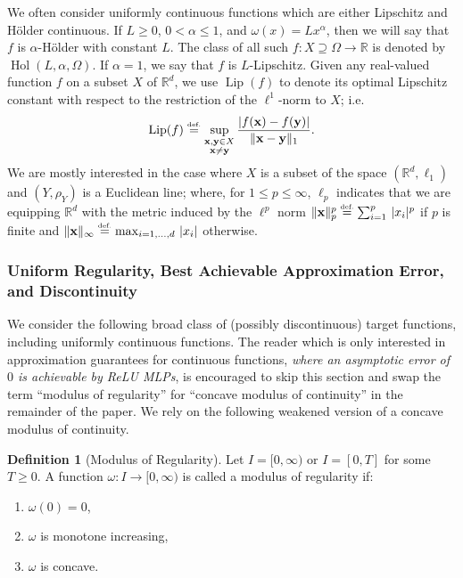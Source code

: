 \documentclass{article}
\numberwithin{equation}{section}
\theoremstyle{definition}
\newtheorem{definition}{Definition}[section]
\newcommand{\eqdef}{\ensuremath{\stackrel{\mbox{\upshape\tiny def.}}{=}}}
\begin{document}
We often consider uniformly continuous functions which are either Lipschitz and H\"{o}lder continuous.
If $L\ge 0$, $0<\alpha \le 1$, and $\omega(x)=Lx^{\alpha}$, then we will say that $f$ is $\alpha$-H\"{o}lder with constant $L$. 
The class of all such $f:X \supseteq\Omega \rightarrow \mathbb{R}$ is denoted by $\operatorname{Hol}(L,\alpha,\Omega)$.
If $\alpha=1$, we say that $f$ is $L$-Lipschitz.  Given any real-valued function $f$ on a subset $X$ of $\mathbb{R}^d$, we use $\operatorname{Lip}(f)$ to denote its optimal Lipschitz constant with respect to the restriction of the $\ell^1$-norm to $X$; i.e.
\[
    \operatorname{Lip}(f) \eqdef 
    \sup\limits_{
        \substack{ \mathbf{x},\mathbf{y} \in X \\
                   \mathbf{x} \ne \mathbf{y}
        }
    }
    \frac{|f(\mathbf{x}) - f(\mathbf{y})|}{\|\mathbf{x} - \mathbf{y}\|_{1}}
.
\]
We are mostly interested in the case where $X$ is a subset of the space $(\mathbb{R}^d,\ell_1)$ and $(Y,\rho_Y)$ is a Euclidean line; where, for $1\le p\le \infty$, $\ell_p$ indicates that we are equipping $\mathbb{R}^d$ with the metric induced by the $\ell^p$ norm $\|\mathbf{x}\|_p^p\eqdef \sum_{i=1}^p\,|x_i|^p$ if $p$ is finite and $\|\mathbf{x}\|_{\infty}\eqdef \max_{i=1,\dots,d}\, |x_i|$ otherwise.  

\subsubsection{Uniform Regularity, Best Achievable Approximation Error, and Discontinuity}
\label{s:Prelim__ss:Regularity___sss:Disc}

We consider the following broad class of (possibly discontinuous) target functions, including uniformly continuous functions. 
The reader which is only interested in approximation guarantees for continuous functions, \textit{where an asymptotic error of $0$ is achievable by ReLU MLPs}, is encouraged to skip this section and swap the term ``modulus of regularity'' for ``concave modulus of continuity'' in the remainder of the paper.
We rely on the following weakened version of a concave modulus of continuity.  


\begin{definition}[Modulus of Regularity]
\label{defn:modulus_regularity}
Let $I=[0,\infty)$ or $I=[0,T]$ for some $T\ge 0$.
A function $\omega:I\to [0,\infty)$ is called a modulus of regularity if: 
\begin{enumerate}
    \item $\omega(0)=0$,
    \item $\omega$ is monotone increasing,
    \item $\omega$ is concave. 
\end{enumerate}  
\end{definition}
\end{document}

